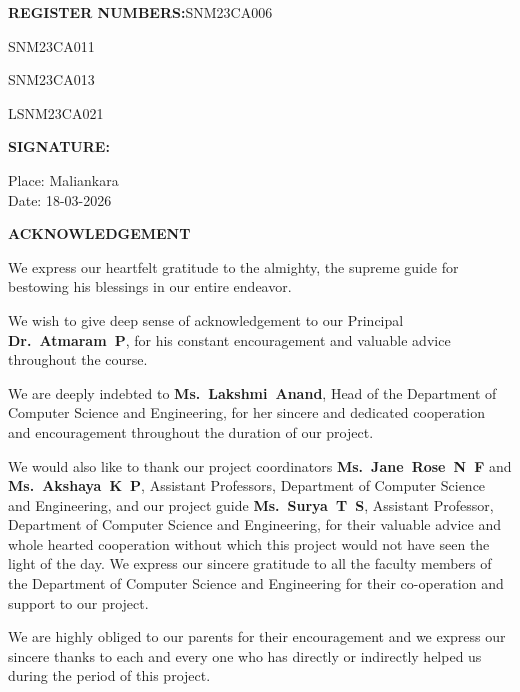 \hspace{3.15cm}\textbf{REGISTER NUMBERS:}\hspace{.8cm}SNM23CA006

\hspace{8.48cm}SNM23CA011

\hspace{8.48cm}SNM23CA013
                            
\hspace{8.48cm}LSNM23CA021

\vspace{0.4cm}

\hspace{3.18cm}\textbf{SIGNATURE:}
\vspace{2.2cm}
\begin{flushleft} 
Place: Maliankara\\
Date: 18-03-2026
\end{flushleft}
\newpage

\newpage
{}
\thispagestyle{empty}

\begin{center}
\fontsize{14}{17}\selectfont
\textsc{\textbf{ACKNOWLEDGEMENT}}
\end{center}

\vspace{6mm}

\noindent We express our heartfelt gratitude to the almighty, the supreme guide for bestowing his blessings in our entire endeavor.

\vspace{10pt}

\noindent We wish to give deep sense of acknowledgement to our Principal \textbf{Dr.~Atmaram~P}, for his constant encouragement and valuable advice throughout the course.

\vspace{10pt}

\noindent We are deeply indebted to \textbf{Ms.~Lakshmi~Anand}, Head of the Department of Computer Science and Engineering, for her sincere and dedicated cooperation and encouragement throughout the duration of our project.

\vspace{10pt}

\noindent We would also like to thank our project coordinators \textbf{Ms.~Jane~Rose~N~F} and \textbf{Ms.~Akshaya~K~P}, Assistant Professors, Department of Computer Science and Engineering, and our project guide \textbf{Ms.~Surya~T~S}, Assistant Professor, Department of Computer Science and Engineering, for their valuable advice and whole hearted cooperation without which this project would not have seen the light of the day. We express our sincere gratitude to all the faculty members of the Department of Computer Science and Engineering for their co-operation and support to our project.

\vspace{10pt}

\noindent We are highly obliged to our parents for their encouragement and we express our sincere thanks to each and every one who has directly or indirectly helped us during the period of this project.

\newpage